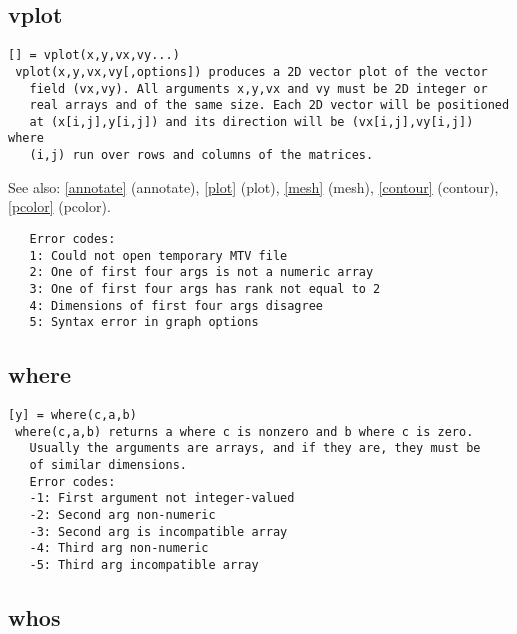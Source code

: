 \documentclass[a4paper]{article}
\begin{document}
\subsection{vplot\label{vplot}}

\begin{tscreen}
\begin{verbatim}
[] = vplot(x,y,vx,vy...)
 vplot(x,y,vx,vy[,options]) produces a 2D vector plot of the vector
   field (vx,vy). All arguments x,y,vx and vy must be 2D integer or
   real arrays and of the same size. Each 2D vector will be positioned
   at (x[i,j],y[i,j]) and its direction will be (vx[i,j],vy[i,j]) where
   (i,j) run over rows and columns of the matrices.
\end{verbatim}

See also: \ref{annotate} {(annotate)}, \ref{plot} {(plot)}, \ref{mesh} {(mesh)}, \ref{contour} {(contour)}, \ref{pcolor} {(pcolor)}.
\begin{verbatim}
   Error codes:
   1: Could not open temporary MTV file
   2: One of first four args is not a numeric array
   3: One of first four args has rank not equal to 2
   4: Dimensions of first four args disagree
   5: Syntax error in graph options 
\end{verbatim}
\end{tscreen}





\subsection{where\label{where}}

\begin{tscreen}
\begin{verbatim}
[y] = where(c,a,b)
 where(c,a,b) returns a where c is nonzero and b where c is zero.
   Usually the arguments are arrays, and if they are, they must be
   of similar dimensions.
   Error codes:
   -1: First argument not integer-valued
   -2: Second arg non-numeric
   -3: Second arg is incompatible array
   -4: Third arg non-numeric
   -5: Third arg incompatible array
\end{verbatim}
\end{tscreen}





\subsection{whos\label{whos}}
\end{document}
